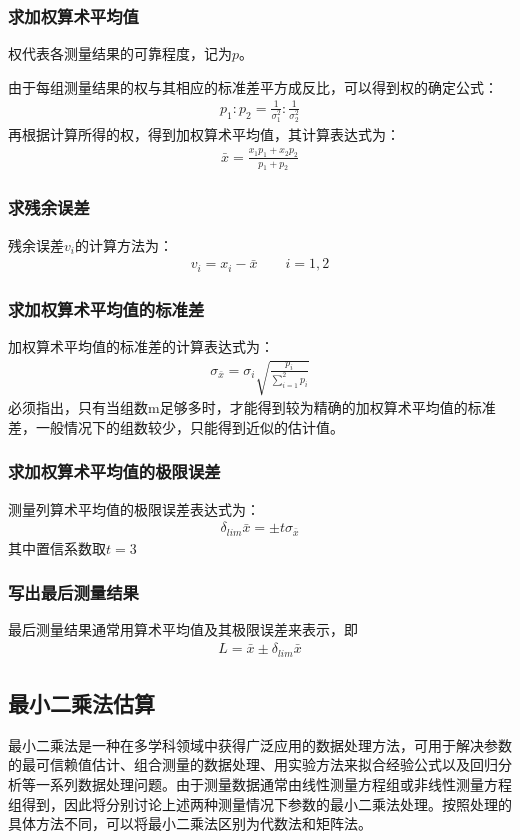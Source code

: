 \documentclass{ctexart}
\begin{document}
			\subsubsection{求加权算术平均值}
				权代表各测量结果的可靠程度，记为$p$。\par
				由于每组测量结果的权与其相应的标准差平方成反比，可以得到权的确定公式：
				\begin{gather*}
					p_1:p_2=\frac{1}{\sigma_1^2}:\frac{1}{\sigma_2^2}
				\end{gather*}
				再根据计算所得的权，得到加权算术平均值，其计算表达式为：
				\begin{gather*}
					\bar{x}=\frac{x_1 p_1+x_2 p_2}{p_1+p_2}
				\end{gather*}
			\subsubsection{求残余误差}		
				残余误差$v_i$的计算方法为：
				\begin{gather*}
					v_i=x_i - \bar{x}\qquad i = 1,2
				\end{gather*}
			\subsubsection{求加权算术平均值的标准差}
				加权算术平均值的标准差的计算表达式为：
				\begin{gather*}
					\sigma_{\bar{x}}=\sigma_i \sqrt{\frac{p_i}{\sum \limits_{i=1}^2 p_i}}
				\end{gather*}
				必须指出，只有当组数m足够多时，才能得到较为精确的加权算术平均值的标准差，一般情况下的组数较少，只能得到近似的估计值。	
			\subsubsection{求加权算术平均值的极限误差}
				测量列算术平均值的极限误差表达式为：
				\begin{gather*}
					\delta_{lim} \bar{x}= \pm t \sigma_{\bar{x}}
				\end{gather*}
				其中置信系数取$t=3$
				\subsubsection{写出最后测量结果}
				最后测量结果通常用算术平均值及其极限误差来表示，即
				\begin{gather*}
					L=\bar{x} \pm 	\delta_{lim} \bar{x}
				\end{gather*}
		\subsection{最小二乘法估算}
			最小二乘法是一种在多学科领域中获得广泛应用的数据处理方法，可用于解决参数的最可信赖值估计、组合测量的数据处理、用实验方法来拟合经验公式以及回归分析等一系列数据处理问题。由于测量数据通常由线性测量方程组或非线性测量方程组得到，因此将分别讨论上述两种测量情况下参数的最小二乘法处理。按照处理的具体方法不同，可以将最小二乘法区别为代数法和矩阵法。
\end{document}
